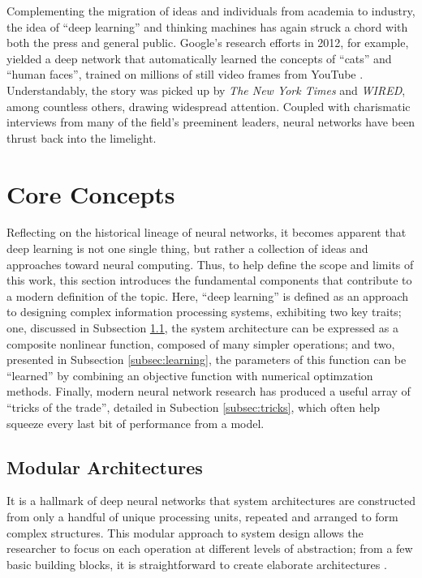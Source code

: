 Complementing the migration of ideas and individuals from academia to industry, the idea of ``deep learning'' and thinking machines has again struck a chord with both the press and general public.
Google's research efforts in 2012, for example, yielded a deep network that automatically learned the concepts of ``cats'' and ``human faces'', trained on millions of still video frames from YouTube \cite{Le2012Building}.
Understandably, the story was picked up by \emph{The New York Times} and \emph{WIRED}, among countless others, drawing widespread attention.
Coupled with charismatic interviews from many of the field's preeminent leaders, neural networks have been thrust back into the limelight. %


\section{Core Concepts}
\label{sec:deep_core}

Reflecting on the historical lineage of neural networks, it becomes apparent that deep learning is not one single thing, but rather a collection of ideas and approaches toward neural computing.
Thus, to help define the scope and limits of this work, this section introduces the fundamental components that contribute to a modern definition of the topic.
Here, ``deep learning'' is defined as an approach to designing complex information processing systems, exhibiting two key traits;
one, discussed in Subsection \ref{subsec:architectures}, the system architecture can be expressed as a composite nonlinear function, composed of many simpler operations;
and two, presented in Subsection \ref{subsec:learning}, the parameters of this function can be ``learned'' by combining an objective function with numerical optimzation methods.
Finally, modern neural network research has produced a useful array of ``tricks of the trade'', detailed in Subection \ref{subsec:tricks}, which often help squeeze every last bit of performance from a model.


\subsection{Modular Architectures}
\label{subsec:architectures}

It is a hallmark of deep neural networks that system architectures are constructed from only a handful of unique processing units, repeated and arranged to form complex structures.
This modular approach to system design allows the researcher to focus on each operation at different levels of abstraction;
from a few basic building blocks, it is straightforward to create elaborate architectures \cite{Szegedy2014Going}.

